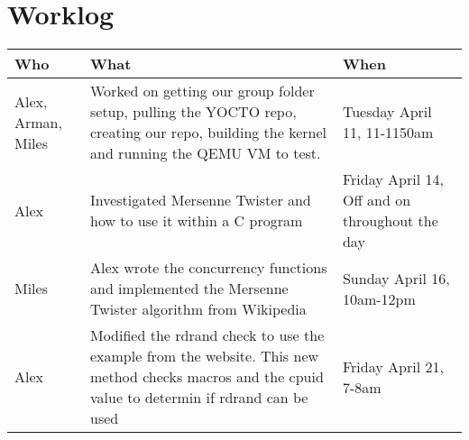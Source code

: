 \documentclass[letterpaper,10pt,draftclsnofoot,onecolumn]{IEEEtran}
\begin{document}
\section{Worklog}
\begin{tabular}{| p{2.1in} | p{2.3in} | p{2.1in} |}
\hline
Who & What & When \\
\hline
Alex, Arman, Miles & Worked on getting our group folder setup, pulling the YOCTO repo, creating our repo, building the kernel and running the QEMU VM to test. & Tuesday April 11, 11-1150am\\
\hline
Alex & Investigated Mersenne Twister and how to use it within a C program & Friday April 14, Off and on throughout the day\\
\hline
Miles & Alex wrote the concurrency functions and implemented the Mersenne Twister algorithm from Wikipedia & Sunday April 16, 10am-12pm\\
\hline
Alex & Modified the rdrand check to use the example from the website. This new method checks macros and the cpuid value to determin if rdrand can be used & Friday April 21, 7-8am \\
\hline

\end{tabular}



%
\end{document}
